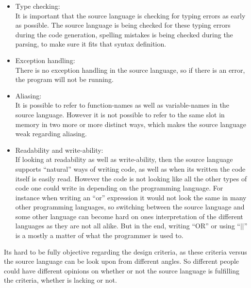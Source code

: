 \begin{itemize}
\item Type checking: \\
It is important that the source language is checking for typing errors as early as possible. The source language is being checked for these typing errors during the code generation, spelling mistakes is being checked during the parsing, to make sure it fits that syntax definition.
\item Exception handling: \\
There is no exception handling in the source language, so if there is an error, the program will not be running.
\item Aliasing: \\
It is possible to refer to function-names as well as variable-names in the source language. However it is not possible to refer to the same slot in memory in two more or more distinct ways, which makes the source language weak regarding aliasing. 
\item Readability and write-ability: \\
If looking at readability as well as write-ability, then the source language supports ``natural'' ways of writing code, as well as when its written the code itself is easily read. However the code is not looking like all the other types of code one could write in depending on the programming language. For instance when writing an ``or'' expression it would not look the same in many other programming languages, so switching between the source language and some other language can become hard on ones interpretation of the different languages as they are not all alike. But in the end, writing ``OR'' or using ``$||$'' is a mostly a matter of what the programmer is used to. 
\end{itemize}
Its hard to be fully objective regarding the design criteria, as these criteria versus the source language can be look upon from different angles. So different people could have different opinions on whether or not the source language is fulfilling the criteria, whether is lacking or not. 